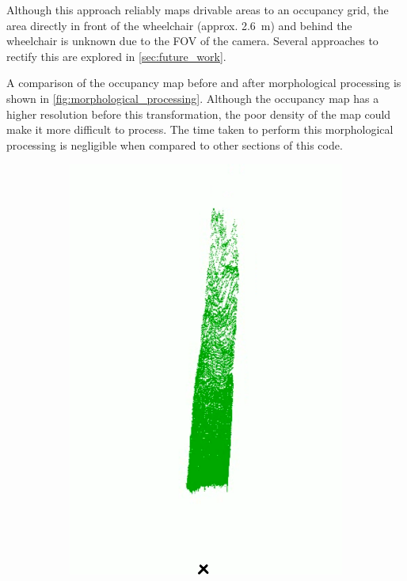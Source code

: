 Although this approach reliably maps drivable areas to an occupancy grid,
the area directly in front of the wheelchair (approx. \SI{2.6}{\metre}) and behind the wheelchair is unknown due to the FOV of the camera.
Several approaches to rectify this are explored in \cref{sec:future_work}.

A comparison of the occupancy map before and after morphological processing is shown in \cref{fig:morphological_processing}.
Although the occupancy map has a higher resolution before this transformation, the poor density of the map
could make it more difficult to process. The time taken to perform this morphological processing is negligible
when compared to other sections of this code.

\begin{figure}[b]
    \centering
    \begin{subfigure}{.3\textwidth}
        \centering
        \includegraphics[width=\linewidth]{images/occupancy_map1_nomorph.png}

\end{subfigure}
\end{figure}
